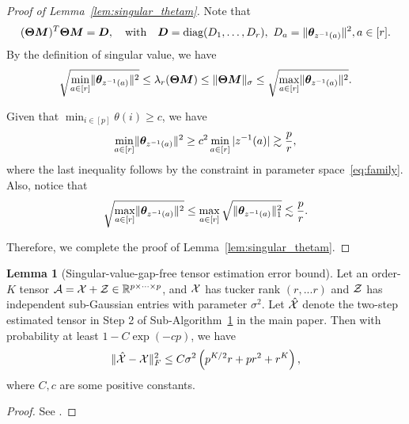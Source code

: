 \documentclass[lettersize,onecolumn,journal]{IEEEtran}
\theoremstyle{definition}
\newtheorem{lem}{Lemma}
\theoremstyle{definition}
\newcommand{\of}[1]{\left(#1\right)}
\begin{document}
\begin{proof}[Proof of Lemma~\ref{lem:singular_thetam}] Note that 
\begin{equation}
    (\boldsymbol{\Theta}\bm M)^T \boldsymbol{\Theta} \bm M = \bm{D}, \quad \text{with} \quad \bm{D} = \text{diag}(D_1,\ldots, D_r), \ D_a = \lVert\boldsymbol{\theta}_{z^{-1}(a)}\rVert^2, a \in [r].
\end{equation}
By the definition of singular value, we have 
\begin{equation}
     \sqrt{\min_{a \in [r]}\lVert \boldsymbol{\theta}_{ z^{-1}(a)} \rVert^2 } \leq \lambda_r(\boldsymbol{\Theta} \bm M) \leq \lVert\boldsymbol{\Theta}\bm M\rVert_{\sigma} \leq \sqrt{ \max_{a \in [r]}\lVert \boldsymbol{\theta}_{ z^{-1}(a)} \rVert^2}.
\end{equation}


Given that $\min_{i \in [p]}\theta(i) \geq c$, we have  
\begin{equation}
   \min_{a \in [r]} \lVert \boldsymbol{\theta}_{ z^{-1}(a)} \rVert^2 \geq c^2 \min_{a \in [r]} |z^{-1}(a)| \gtrsim \frac{p}{r},
\end{equation}
where the last inequality follows by the constraint in parameter space~\eqref{eq:family}. Also, notice that 
\begin{equation}
    \sqrt{\max_{a \in [r]}\lVert \boldsymbol{\theta}_{ z^{-1}(a)} \rVert^2 } \leq \max_{a \in [r]} \sqrt{ \lVert \boldsymbol{\theta}_{ z^{-1}(a)} \rVert^2_1} \lesssim \frac{p}{r}.
\end{equation}

 Therefore, we complete the proof of Lemma~\ref{lem:singular_thetam}.
\end{proof}


\begin{lem}[Singular-value-gap-free tensor estimation error bound]\label{lem:two-step_esterror} Let an order-$K$ tensor $\mathcal{A} = \mathcal{X} + \mathcal{Z} \in \mathbb{R}^{p \times \cdots \times p}$, and $\mathcal{X}$ has tucker rank $(r,...r)$ and $\mathcal{Z}$ has independent sub-Gaussian entries with parameter $\sigma^2$. Let $\hat {\mathcal{X}}$ denote the two-step estimated tensor in Step 2 of Sub-Algorithm~\hyperref[alg:main]{1} in the main paper. Then with probability at least $1 - C \exp\of{- cp }$, we have
\begin{align}
    \onormSize{}{\hat \tX - \tX}_F^2 \leq C \sigma^2 \of{ p^{K/2}r + pr^2 + r^K },
\end{align}
where $C, c$ are some positive constants.
\end{lem}

\begin{proof}
See \citet[Proposition 1]{han2020exact}.
\end{proof}
\end{document}

